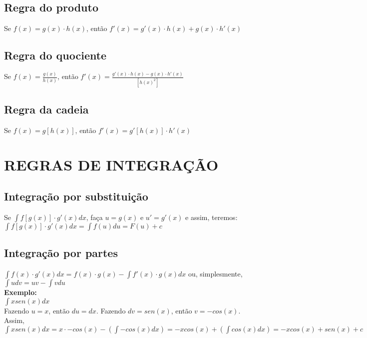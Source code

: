 \documentclass[12pt]{article}
\begin{document}
\subsection{Regra do produto}
Se $f(x) = g(x) \cdot h(x)$, então $f'(x) = g'(x) \cdot h(x) + g(x) \cdot h'(x)$

\subsection{Regra do quociente}
Se $f(x) = \displaystyle\frac{g(x)}{h(x)}$, então $f'(x) = \displaystyle\frac{g'(x) \cdot h(x) - g(x) \cdot h'(x)}{[h(x)^2]}$

\subsection{Regra da cadeia}
Se $f(x) = g[h(x)]$, então $f'(x) = g'[h(x)] \cdot h'(x)$


\section{REGRAS DE INTEGRAÇÃO}

\subsection{Integração por substituição}

Se $\displaystyle\int{f[g(x)] \cdot g'(x)dx}$, faça $u = g(x)$ e $u' = g'(x)$ e assim, teremos:
$\displaystyle\int{f[g(x)] \cdot g'(x)dx} = \displaystyle\int{f(u)du} = F(u) + c$


\subsection{Integração por partes}

$\displaystyle\int{f(x) \cdot g'(x)dx} = f(x) \cdot g(x) - \displaystyle\int{f'(x) \cdot g(x)dx}$ ou, simplesmente,
$\displaystyle\int{udv} = uv - \displaystyle\int{vdu}$\\[4mm]
\textbf{Exemplo:}\\[2mm]
$\displaystyle\int{xsen(x)dx}$\\[2mm]
Fazendo $u = x$, então $du = dx$. Fazendo $dv = sen(x)$, então $v = -cos(x)$. Assim,\\[2mm]
$\displaystyle\int{xsen(x)dx} = x \cdot -cos(x) - \left(\displaystyle\int{-cos(x)dx}\right) = -xcos(x) + \left(\displaystyle\int{cos(x)dx}\right) = -xcos(x) + sen(x) + c$
\end{document}
